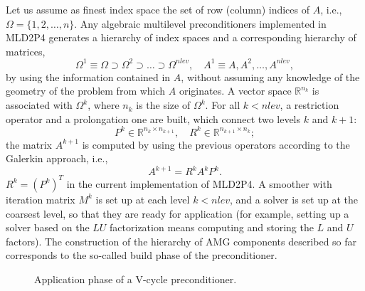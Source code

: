 Let us assume as finest index space the set of row (column) indices of $A$, i.e.,
$\Omega = \{1, 2, \ldots, n\}$. 
Any algebraic multilevel preconditioners implemented in MLD2P4 generates
a hierarchy of index spaces and a corresponding hierarchy of matrices,
\[ \Omega^1 \equiv \Omega \supset \Omega^2 \supset \ldots \supset \Omega^{nlev},
\quad A^1 \equiv A, A^2, \ldots, A^{nlev}, \]
by using the information contained in $A$, without assuming any
knowledge of the geometry of the problem from which $A$ originates.
A vector space $\mathbb{R}^{n_{k}}$ is associated with $\Omega^k$,
where $n_k$ is the size of $\Omega^k$.
For all $k < nlev$, a restriction operator and a prolongation one are built,
which connect two levels $k$ and $k+1$:
$$
    P^k \in \mathbb{R}^{n_k \times n_{k+1}}, \quad 
    R^k \in \mathbb{R}^{n_{k+1}\times n_k};
$$
the matrix $A^{k+1}$ is computed by using the previous operators according
to the Galerkin approach, i.e.,
$$
  A^{k+1}=R^kA^kP^k.
$$
$R^k=(P^k)^T$ in the current implementation of MLD2P4.
A smoother with iteration matrix $M^k$ is set up at each level $k < nlev$, and a solver
is set up at the coarsest level, so that they are ready for application 
(for example, setting up a solver based on the $LU$ factorization means computing
and storing the $L$ and $U$ factors). The construction of the hierarchy of AMG components
described so far corresponds to the so-called build phase of the preconditioner.

\begin{figure}[t]
\begin{center} 
\caption{Application phase of a V-cycle preconditioner.\label{fig:application_alg}}
\end{center}
\end{figure}

